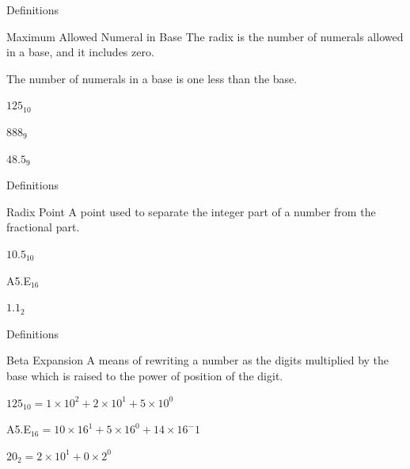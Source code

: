 \documentclass{beamer}
\begin{document}
\begin{frame}{Definitions}
  \begin{block}{Maximum Allowed Numeral in Base}
    The radix is the number of numerals allowed in a base, and it includes zero.

    The number of numerals in a base is one less than the base.
  \end{block}

  \begin{example}
    $125_{10}$

    $888_9$

    $48.5_9$
  \end{example}
\end{frame}


\begin{frame}{Definitions}
  \begin{block}{Radix Point}
    A point used to separate the integer part of a number from the fractional part.
  \end{block}\pause

  \begin{example}
    $10.5_{10}$

    A5.E$_{16}$

    $1.1_2$
  \end{example}
\end{frame}

\begin{frame}{Definitions}
  \begin{block}{Beta Expansion}
    A means of rewriting a number as the digits multiplied by the base which is raised to the power of position of the digit.
  \end{block}\pause

  \begin{example}
    $125_{10} = 1\times10^2 + 2\times10^1 + 5\times10^0$

    A5.E$_{16} = 10\times16^1 + 5\times16^0 + 14\times16^-1$

    $20_2 = 2\times10^1+0\times2^0$
  \end{example}
\end{frame}








\end{document}

